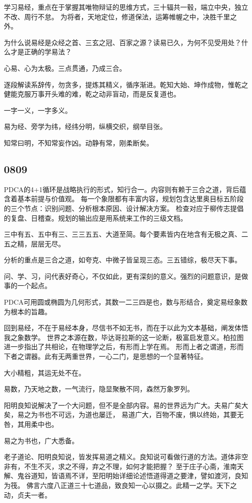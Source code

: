 学习易经，重点在于掌握其唯物辩证的思维方式，三十辐共一毂，端立中央，独立不改、周行不怠。
为将者，天地定位，修道保法，运筹帷幄之中，决胜千里之外。

为什么说易经是众经之首、三玄之冠、百家之源？读易已久，为何不见受用处？什么才是正确的学易法？

心易、心为太极。三点贯通，乃成三合。

逐段解读系辞传，勿贪多，提炼其精义，循序渐进。乾知大始、坤作成物，惟乾之健能克服万事开头难的难，乾之动非盲动，而是反复道也。

一字一义，一字多义。

易为经、旁学为纬，经纬分明，纵横交织，纲举目张。

知常曰明，不知常妄作凶。动静有常，刚柔断矣。

\subsection{0809}

PDCA的4+1循环是战略执行的形式，知行合一。内容则有赖于三合之道，背后蕴含着基本前提与价值观。
每一个象限都有丰富内容，规划包含达里奥目标五阶段的三个节点：识别问题、分析根本原因、设计解决方案。
检查对应于柳传志提倡的复盘、日稽查。规划的输出应是用系统来工作的三级文档。

三中有五、五中有三、三三五五、大道至简。每个要素皆内在地含有无极之真、二五之精，层层无尽。

分析的重点是三合之道，如夸克、中微子皆呈现三态。三五错综，极尽天下事。

问、学、习，问代表好奇心，不仅如此，更有深刻的意义。强烈的问题意识，是做事的一个起点。

PDCA可用圆或椭圆为几何形式，其数一二三四是也，数与形结合，奠定易经象数为根本的旨趣。

回到易经，不在于易经本身，尽信书不如无书，而在于以此为文本基础，阐发体悟我之象数学。
世界之本源在数，毕达哥拉斯的这一论断，极富启发意义。柏拉图进一步指出了共相论，在物理学之后，有形而上学在焉。
形而上者之谓道，形而下者之谓器。此有无两重世界，一心二门，是思想的一个显著特征。

大小精粗，其运无处不在。

易数，乃天地之数，一气流行，隐显聚散不同，森然万象罗列。

阳明良知说解决了一个大问题，但不是全部内容。易的世界远为广大。夫易广矣大矣，易之为书也不可远，为道也屡迁，
易道广大，百物不废，惧以终始，其要无咎，其用柔中也。

易之为书也，广大悉备。

老子道论、阳明良知说，皆发挥易道之精义。良知说可看做行道的方法。道体非空非有，不生不灭，求之不得，弃之不理，如何才能把握？
至于庄子心斋，淮南天解、鬼谷道知，皆语焉不详，至阳明始详细论述悟道得道之要津，譬如渡河，良知为筏。
佛言六度八正道三十七道品，致良知一心以摄之。此精一之学。天下之动，贞夫一者。

